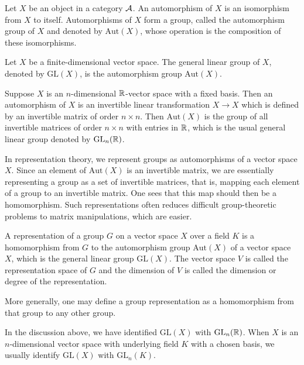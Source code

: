 Let $X$ be an object in a category $\mathcal{A}$. An automorphism of $X$ is an isomorphism from $X$ to itself. Automorphisms of $X$ form a group, called the automorphism group of $X$ and denoted by $\text{Aut}(X)$, whose operation is the composition of these isomorphisms.

\begin{propdef}
\label{sec:representations}
Let $X$ be a finite-dimensional vector space. The general linear group of $X$, denoted by $\text{GL}(X)$, is the automorphism group $\text{Aut}(X)$.
\end{propdef}

Suppose $X$ is an $n$-dimensional $\mathbb{R}$-vector space with a fixed basis. Then an automorphism of $X$ is an invertible linear transformation $X \to X$ which is defined by an invertible matrix of order $n\times n$. Then $\text{Aut}(X)$ is the group of all invertible matrices of order $n\times n$ with entries in $\mathbb{R}$, which is the usual general linear group denoted by $\text{GL}_n(\mathbb{R})$.

In representation theory, we represent groups as automorphisms of a vector space $X$. Since an element of $\text{Aut}(X)$ is an invertible matrix, we are essentially representing a group as a set of invertible matrices, that is, mapping each element of a group to an invertible matrix. One sees that this map should then be a homomorphism. Such representations often reduces difficult group-theoretic problems to matrix manipulations, which are easier.

\begin{propdef}
  \label{sec:representations-1}
  A representation of a group $G$ on a vector space $X$ over a field $K$ is a homomorphism from $G$ to the automorphism group $\text{Aut}(X)$ of a vector space $X$, which is the general linear group $\text{GL}(X)$. The vector space $V$ is called the representation space of $G$ and the dimension of $V$ is called the dimension or degree of the representation.
\end{propdef}

More generally, one may define a group representation as a homomorphism from that group to any other group.

\begin{remark}
\label{sec:representations-2}
  In the discussion above, we have identified $\text{GL}(X)$ with $\text{GL}_n(\mathbb{R})$. When $X$ is an $n$-dimensional vector space with underlying field $K$ with a chosen basis, we usually identify $\text{GL}(X)$ with $\text{GL}_n(K)$.
\end{remark}

